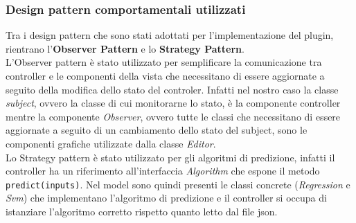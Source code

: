 \subsubsection{Design pattern comportamentali utilizzati}
Tra i design pattern che sono stati adottati per l'implementazione del plugin, rientrano l'\textbf{Observer Pattern} e lo \textbf{Strategy Pattern}. \\
L'Observer pattern è stato utilizzato per semplificare la comunicazione tra controller e le componenti della vista che necessitano di essere aggiornate a seguito della modifica dello stato del controler. Infatti nel nostro caso la classe \textit{subject}, ovvero la classe di cui monitorarne lo stato, è la componente controller mentre la componente \textit{Observer}, ovvero tutte le classi che necessitano di essere aggiornate a seguito di un cambiamento dello stato del subject, sono le componenti grafiche utilizzate dalla classe \textit{Editor}. \\
Lo Strategy pattern è stato utilizzato per gli algoritmi di predizione, infatti il controller ha un riferimento all'interfaccia \textit{Algorithm} che espone il metodo \texttt{predict(inputs)}. Nel model sono quindi presenti le classi concrete (\textit{Regression} e \textit{Svm}) che implementano l'algoritmo di predizione e il controller si occupa di istanziare l'algoritmo corretto rispetto quanto letto dal file json.
